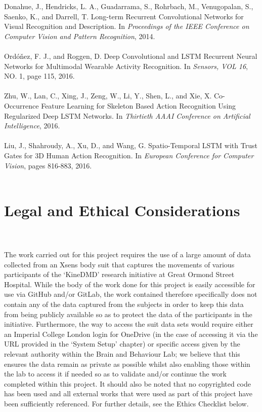 \documentclass[12pt,twoside]{report}
\begin{document}
\quad [20] Donahue, J., Hendricks, L. A., Guadarrama, S., Rohrbach, M., Venugopalan, S., Saenko, K., and Darrell, T. Long-term Recurrent Convolutional Networks for Visual Recognition and Description. In \textit{Proceedings of the IEEE Conference on Computer Vision and Pattern Recognition}, 2014.\\ \\
\quad [21] Ordóňez, F. J., and Roggen, D. Deep Convolutional and LSTM Recurrent Neural Networks for Multimodal Wearable Activity Recognition. In \textit{Sensors, VOL 16}, NO. 1, page 115, 2016.\\ \\
\quad [22] Zhu, W., Lan, C., Xing, J., Zeng, W., Li, Y., Shen, L., and Xie, X. Co-Occurrence Feature Learning for Skeleton Based Action Recognition Using Regularized Deep LSTM Networks. In \textit{Thirtieth AAAI Conference on Artificial Intelligence}, 2016.\\ \\
\quad [23] Liu, J., Shahroudy, A., Xu, D., and Wang, G. Spatio-Temporal LSTM with Trust Gates for 3D Human Action Recognition. In \textit{European Conference for Computer Vision}, pages 816-883, 2016.\\ \\







\chapter{Legal and Ethical Considerations\\~\\}

\quad The work carried out for this project requires the use of a large amount of data collected from an Xsens body suit that captures the movements of various participants of the ‘KineDMD’ research initiative at Great Ormond Street Hospital. While the body of the work done for this project is easily accessible for use via GitHub and/or GitLab, the work contained therefore specifically does not contain any of the data captured from the subjects in order to keep this data from being publicly available so as to protect the data of the participants in the initiative. Furthermore, the way to access the suit data sets would require either an Imperial College London login for OneDrive (in the case of accessing it via the URL provided in the ‘System Setup’ chapter) or specific access given by the relevant authority within the Brain and Behaviour Lab; we believe that this ensures the data remain as private as possible whilst also enabling those within the lab to access it if needed so as to validate and/or continue the work completed within this project. It should also be noted that no copyrighted code has been used and all external works that were used as part of this project have been sufficiently referenced. For further details, see the Ethics Checklist below.
\end{document}
